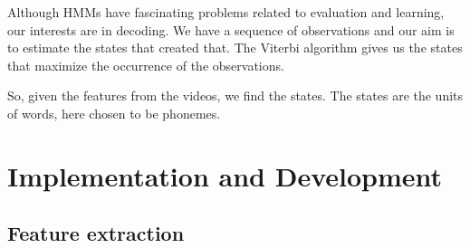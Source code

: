\documentclass[a4paper]{article}
\begin{document}
Although HMMs have fascinating problems related to evaluation and learning, our interests are in decoding. We have a sequence of observations and our aim is to estimate the states that created that. The Viterbi algorithm \cite{key-3} gives us the states that maximize the occurrence of the observations. 

So, given the features from the videos, we find the states. The states are the units of words, here chosen to be phonemes. 
\section{Implementation and Development}

\subsection{Feature extraction}
\end{document}
